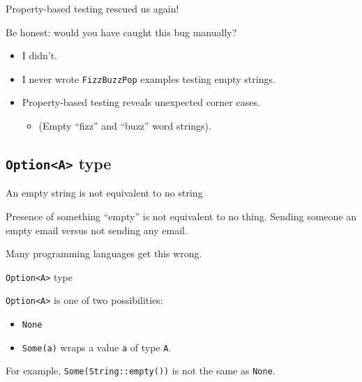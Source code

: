 
\begin{frame}[fragile]{Property-based testing rescued us again!}
  \begin{block}{Be honest: would you have caught this bug manually?}
    \begin{itemize}
    \item I didn't.
    \item I never wrote \texttt{FizzBuzzPop} examples testing empty strings.
    \item Property-based testing reveals \alert{unexpected} corner cases.
      \begin{itemize}
      \item (Empty ``fizz'' and ``buzz'' word strings).
      \end{itemize}
    \end{itemize}
  \end{block}
\end{frame}

\subsection{\texttt{Option<A>} type}

\begin{frame}{An empty string is \alert{not} equivalent to no string}
  \begin{block}{Presence of something ``empty'' is \alert{not} equivalent to no thing.}
    Sending someone an empty email versus not sending any email.
  \end{block}
  
  Many programming languages get this wrong.
\end{frame}

\begin{frame}[fragile]{\texttt{Option<A>} type}

  \texttt{Option<A>} is one of two possibilities:
  \begin{itemize}
  \item \texttt{None}
  \item \texttt{Some(a)} wraps a value \texttt{a} of type \texttt{A}.
  \end{itemize}

  For example, \texttt{Some(String::empty())} is not the same as \texttt{None}.

  \inputminted{rust}{OptionExample1.rs}
\end{frame}

